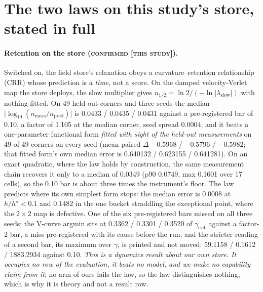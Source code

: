 \documentclass{article} %
\begin{document}
\section{The two laws on this study's store, stated in full}
\label{app:laws}

\paragraph{Retention on the store (\textsc{confirmed [this study]}).} Switched on, the field
store's relaxation obeys a curvature--retention relationship (CRR) whose prediction is a
\emph{time}, not a score. On the damped velocity-Verlet map the store deploys, the slow
multiplier gives $n_{1/2}=\ln2/(-\ln\lvert\lambda_{\text{slow}}\rvert)$ with nothing fitted. On 49
held-out corners and three seeds the median $\lvert\log_{10}(n_{\text{meas}}/n_{\text{pred}})\rvert$ is
0.0433 / 0.0435 / 0.0431 against a pre-registered bar of 0.10, a factor of 1.105 at the median
corner, seed spread 0.0004; and it beats a one-parameter functional form \emph{fitted with sight
of the held-out measurements} on 49 of 49 corners on every seed (mean paired $\Delta$ $-0.5968$ /
$-0.5796$ / $-0.5982$; that fitted form's own median error is 0.640132 / 0.623155 / 0.641281).
On an exact quadratic, where the law holds by construction, the same measurement chain recovers it
only to a median of 0.0349 (p90 0.0749, max 0.1601 over 17 cells), so the 0.10 bar is about three
times the instrument's floor. %
The law predicts where its own simplest form stops: the median error is 0.0008 at $h/h^\star<0.1$
and 0.1482 in the one bucket straddling the exceptional point, where the $2\times2$ map is
defective. %
One of the six pre-registered bars missed on all three seeds: the V-curve argmin sits at 0.3362 /
0.3301 / 0.3520 of $\gamma_{\text{crit}}$ against a factor-2 bar, a miss pre-registered with its
cause before the run; and the stricter reading of a second bar, its maximum over $\gamma$, is
printed and not moved: 59.1158 / 0.1612 / 1883.2934 against 0.10.
\emph{This is a dynamics result about our own store. It occupies no row of the evaluation, it
beats no model, and we make no capability claim from it}; no arm of ours fails the law, so the law
distinguishes nothing, which is why it is theory and not a result row.
\end{document}

